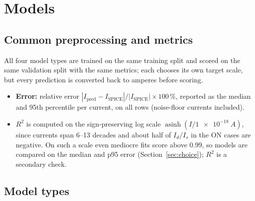 \documentclass[11pt,a4paper]{article}
\begin{document}
\section{Models}

\subsection{Common preprocessing and metrics}
All four model types are trained on the same training split and scored on the same validation
split with the same metrics; each chooses its own target scale, but every prediction is converted
back to amperes before scoring.
\begin{itemize}
  \item \textbf{Error:} relative error $|I_{\mathrm{pred}}-I_{\mathrm{SPICE}}|/|I_{\mathrm{SPICE}}|\times100\,\%$, reported as
        the median and 95th percentile per current, on all rows (noise-floor currents included).
  \item \textbf{$R^2$} is computed on the sign-preserving log scale $\operatorname{asinh}(I/\SI{1e-18}{A})$,
        since currents span 6--13 decades and about half of $I_d/I_s$ in the ON cases are negative. On
        such a scale even mediocre fits score above 0.99, so models are compared on the median and p95
        error (Section~\ref{sec:choice}); $R^2$ is a secondary check.
\end{itemize}

\subsection{Model types}
\end{document}
